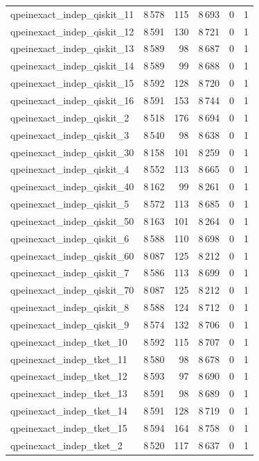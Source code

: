 \begin{longtable}{lrrrrr}
qpeinexact\_indep\_qiskit\_11 & 8\,578 & 115 & 8\,693 & 0 & 1 \\
qpeinexact\_indep\_qiskit\_12 & 8\,591 & 130 & 8\,721 & 0 & 1 \\
qpeinexact\_indep\_qiskit\_13 & 8\,589 & 98 & 8\,687 & 0 & 1 \\
qpeinexact\_indep\_qiskit\_14 & 8\,589 & 99 & 8\,688 & 0 & 1 \\
qpeinexact\_indep\_qiskit\_15 & 8\,592 & 128 & 8\,720 & 0 & 1 \\
qpeinexact\_indep\_qiskit\_16 & 8\,591 & 153 & 8\,744 & 0 & 1 \\
qpeinexact\_indep\_qiskit\_2 & 8\,518 & 176 & 8\,694 & 0 & 1 \\
qpeinexact\_indep\_qiskit\_3 & 8\,540 & 98 & 8\,638 & 0 & 1 \\
qpeinexact\_indep\_qiskit\_30 & 8\,158 & 101 & 8\,259 & 0 & 1 \\
qpeinexact\_indep\_qiskit\_4 & 8\,552 & 113 & 8\,665 & 0 & 1 \\
qpeinexact\_indep\_qiskit\_40 & 8\,162 & 99 & 8\,261 & 0 & 1 \\
qpeinexact\_indep\_qiskit\_5 & 8\,572 & 113 & 8\,685 & 0 & 1 \\
qpeinexact\_indep\_qiskit\_50 & 8\,163 & 101 & 8\,264 & 0 & 1 \\
qpeinexact\_indep\_qiskit\_6 & 8\,588 & 110 & 8\,698 & 0 & 1 \\
qpeinexact\_indep\_qiskit\_60 & 8\,087 & 125 & 8\,212 & 0 & 1 \\
qpeinexact\_indep\_qiskit\_7 & 8\,586 & 113 & 8\,699 & 0 & 1 \\
qpeinexact\_indep\_qiskit\_70 & 8\,087 & 125 & 8\,212 & 0 & 1 \\
qpeinexact\_indep\_qiskit\_8 & 8\,588 & 124 & 8\,712 & 0 & 1 \\
qpeinexact\_indep\_qiskit\_9 & 8\,574 & 132 & 8\,706 & 0 & 1 \\
qpeinexact\_indep\_tket\_10 & 8\,592 & 115 & 8\,707 & 0 & 1 \\
qpeinexact\_indep\_tket\_11 & 8\,580 & 98 & 8\,678 & 0 & 1 \\
qpeinexact\_indep\_tket\_12 & 8\,593 & 97 & 8\,690 & 0 & 1 \\
qpeinexact\_indep\_tket\_13 & 8\,591 & 98 & 8\,689 & 0 & 1 \\
qpeinexact\_indep\_tket\_14 & 8\,591 & 128 & 8\,719 & 0 & 1 \\
qpeinexact\_indep\_tket\_15 & 8\,594 & 164 & 8\,758 & 0 & 1 \\
qpeinexact\_indep\_tket\_2 & 8\,520 & 117 & 8\,637 & 0 & 1 \\

\end{longtable}
